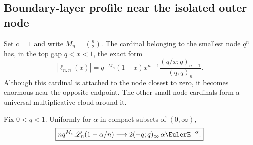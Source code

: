 \subsection{Boundary-layer profile near the isolated outer node}

Set $c=1$ and write $M_n=\binom n2$.  The cardinal belonging to the smallest
node $q^n$ has, in the top gap $q<x<1$, the exact form
\begin{equation}
 |\ell_{n,n}(x)|
 =q^{-M_n}(1-x)x^{n-1}
   \frac{(q/x;q)_{n-1}}{(q;q)_n}.
 \label{gq:eq:last-cardinal-top-gap}
\end{equation}
Although this cardinal is attached to the node closest to zero, it becomes
enormous near the opposite endpoint.  The other small-node cardinals form a
universal multiplicative cloud around it.

\begin{theorem}
\label{gq:thm:lebesgue-profile}
Fix $0<q<1$.  Uniformly for $\alpha$ in compact subsets of $(0,\infty)$,
\begin{equation}
 \boxed{
 n q^{M_n}\Leb_n(1-\alpha/n)
 \longrightarrow
 2(-q;q)_\infty\,\alpha\EulerE^{-\alpha}.}
 \label{gq:eq:lebesgue-profile}
\end{equation}
\end{theorem}

